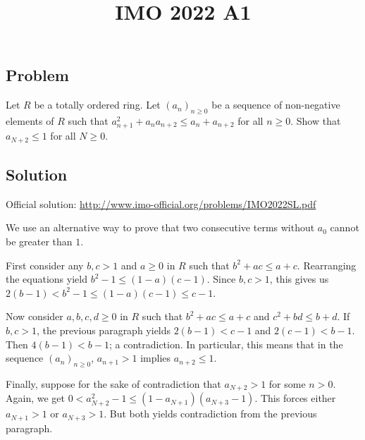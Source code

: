 \documentclass{article}
\title{IMO 2022 A1}
\author{}
\date{}
\begin{document}
\maketitle



\subsection*{Problem}

Let $R$ be a totally ordered ring.
Let $(a_n)_{n \geq 0}$ be a sequence of non-negative elements of $R$ such that $a_{n + 1}^2 + a_n a_{n + 2} \leq a_n + a_{n + 2}$ for all $n \geq 0$.
Show that $a_{N + 2} \leq 1$ for all $N \geq 0$.



\subsection*{Solution}

Official solution: \url{http://www.imo-official.org/problems/IMO2022SL.pdf}

We use an alternative way to prove that two consecutive terms without $a_0$ cannot be greater than $1$.

First consider any $b, c > 1$ and $a \geq 0$ in $R$ such that $b^2 + ac \leq a + c$.
Rearranging the equations yield $b^2 - 1 \leq (1 - a)(c - 1)$.
Since $b, c > 1$, this gives us $2(b - 1) < b^2 - 1 \leq (1 - a)(c - 1) \leq c - 1$.

Now consider $a, b, c, d \geq 0$ in $R$ such that $b^2 + ac \leq a + c$ and $c^2 + bd \leq b + d$.
If $b, c > 1$, the previous paragraph yields $2(b - 1) < c - 1$ and $2(c - 1) < b - 1$.
Then $4(b - 1) < b - 1$; a contradiction.
In particular, this means that in the sequence $(a_n)_{n \geq 0}$, $a_{n + 1} > 1$ implies $a_{n + 2} \leq 1$.

Finally, suppose for the sake of contradiction that $a_{N + 2} > 1$ for some $n > 0$.
Again, we get $0 < a_{N + 2}^2 - 1 \leq (1 - a_{N + 1})(a_{N + 3} - 1)$.
This forces either $a_{N + 1} > 1$ or $a_{N + 3} > 1$.
But both yields contradiction from the previous paragraph.
\end{document}

